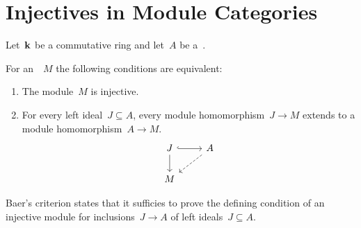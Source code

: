 \section{Injectives in Module Categories}


\begin{conventionnonum}
  Let~$\mathbf{k}$ be a commutative ring and let~$A$ be a~{\kalg}.
\end{conventionnonum}


\begin{theorem}
  \label{baers criterion}
  For an~{}~$M$ the following conditions are equivalent:
  \begin{enumerate}
    \item
      The module~$M$ is injective.
    \item
      \label{Baer condition}
      For every left ideal~$J \subseteq A$, every module homomorphism~$J \to M$ extends to a module homomorphism~$A \to M$.
      \[
        \begin{tikzcd}
            J
            \arrow[hook]{r}
            \arrow{d}
          & A
            \arrow[dashed]{dl}
          \\
            M
          & {}
        \end{tikzcd}
      \]
  \end{enumerate}
\end{theorem}


\begin{remark*}
  Baer’s criterion states that it sufficies to prove the defining condition of an injective module for inclusions~$J \to A$ of left ideals~$J \subseteq A$.
\end{remark*}


